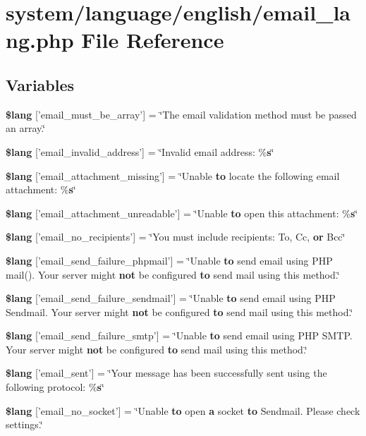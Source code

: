 \section{system/language/english/email\-\_\-lang.php File Reference}
\label{email__lang_8php}
\subsection*{Variables}
\begin{DoxyCompactItemize}
\item 
{\bf \$lang} ['email\-\_\-must\-\_\-be\-\_\-array'] = \char`\"{}The email validation method must be passed an array.\char`\"{}
\item 
{\bf \$lang} ['email\-\_\-invalid\-\_\-address'] = \char`\"{}Invalid email address\-: \%{\bf s}\char`\"{}
\item 
{\bf \$lang} ['email\-\_\-attachment\-\_\-missing'] = \char`\"{}Unable {\bf to} locate the following email attachment\-: \%{\bf s}\char`\"{}
\item 
{\bf \$lang} ['email\-\_\-attachment\-\_\-unreadable'] = \char`\"{}Unable {\bf to} open this attachment\-: \%{\bf s}\char`\"{}
\item 
{\bf \$lang} ['email\-\_\-no\-\_\-recipients'] = \char`\"{}You must include recipients\-: To, Cc, {\bf or} Bcc\char`\"{}
\item 
{\bf \$lang} ['email\-\_\-send\-\_\-failure\-\_\-phpmail'] = \char`\"{}Unable {\bf to} send email using P\-H\-P mail(). Your server might {\bf not} be configured {\bf to} send mail using this method.\char`\"{}
\item 
{\bf \$lang} ['email\-\_\-send\-\_\-failure\-\_\-sendmail'] = \char`\"{}Unable {\bf to} send email using P\-H\-P Sendmail. Your server might {\bf not} be configured {\bf to} send mail using this method.\char`\"{}
\item 
{\bf \$lang} ['email\-\_\-send\-\_\-failure\-\_\-smtp'] = \char`\"{}Unable {\bf to} send email using P\-H\-P S\-M\-T\-P. Your server might {\bf not} be configured {\bf to} send mail using this method.\char`\"{}
\item 
{\bf \$lang} ['email\-\_\-sent'] = \char`\"{}Your message has been successfully sent using the following protocol\-: \%{\bf s}\char`\"{}
\item 
{\bf \$lang} ['email\-\_\-no\-\_\-socket'] = \char`\"{}Unable {\bf to} open {\bf a} socket {\bf to} Sendmail. Please check settings.\char`\"{}

\end{DoxyCompactItemize}
